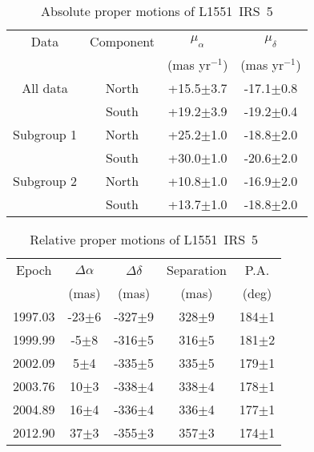 \documentclass[debug]{rmaa}
\begin{document}
\begin{table}[!t]\centering
  \setlength{\tabnotewidth}{1.0\columnwidth}
  \caption{Absolute proper motions of L1551~IRS~5} 
  \label{Table3}
  \scriptsize
\begin{tabular}{cccc}\toprule
 Data      &   Component  &  $\mu_{\alpha}$   &   $\mu_{\delta}$     \\
           &            &  (mas yr$^{-1}$) &  (mas yr$^{-1}$)   \\ \midrule
All data   &   North    &  +15.5$\pm$3.7   &   -17.1$\pm$0.8   \\
           &   South    &  +19.2$\pm$3.9   &   -19.2$\pm$0.4   \\       
Subgroup 1 &   North    &  +25.2$\pm$1.0   &   -18.8$\pm$2.0   \\
           &   South    &  +30.0$\pm$1.0   &   -20.6$\pm$2.0   \\
Subgroup 2 &   North    &  +10.8$\pm$1.0   &   -16.9$\pm$2.0   \\
           &   South    &  +13.7$\pm$1.0   &   -18.8$\pm$2.0   \\

         \bottomrule
\end{tabular}
\end{table}


\begin{table}[!t]\centering
  \setlength{\tabnotewidth}{1.0\columnwidth}
  \caption{Relative proper motions of L1551~IRS~5} 
  \label{Table4}
  \scriptsize
\begin{tabular}{ccccc}\toprule
Epoch    & $\Delta \alpha$ & $\Delta \delta$ & Separation & P.A.    \\
         &      (mas)      &      (mas)      &     (mas)  & (deg)    \\ \midrule
1997.03  & -23$\pm$6   & -327$\pm$9   &   328$\pm$9   &   184$\pm$1  \\
1999.99  &  -5$\pm$8   & -316$\pm$5   &   316$\pm$5   &   181$\pm$2  \\
2002.09  &   5$\pm$4   & -335$\pm$5   &   335$\pm$5   &   179$\pm$1  \\
2003.76  &  10$\pm$3   & -338$\pm$4   &   338$\pm$4   &   178$\pm$1  \\
2004.89  &  16$\pm$4   & -336$\pm$4   &   336$\pm$4   &   177$\pm$1  \\
2012.90  &  37$\pm$3   & -355$\pm$3   &   357$\pm$3   &   174$\pm$1  \\   \bottomrule

\end{tabular}
\end{table}
\end{document}
